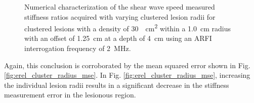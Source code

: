 			\begin{figure}[!htb]
				\centering
				\caption[Numerical characterization of shear wave speed measured stiffness ratio with clustered lesions]{Numerical characterization of the shear wave speed measured stiffness ratios acquired with varying clustered lesion radii for clustered lesions with a density of \SI{30}{\per\cm\squared} within a \SI{1.0}{cm} radius with an offset of \SI{1.25}{\cm} at a depth of \SI{4}{\cm} using an ARFI interrogation frequency of \SI{2}{\MHz}.}
				\label{fig:erel_cluster_radius}
			\end{figure}

			Again, this conclusion is corroborated by the mean squared error shown in Fig. \ref{fig:erel_cluster_radius_mse}. In Fig. \ref{fig:erel_cluster_radius_mse}, increasing the individual lesion radii results in a significant decrease in the stiffness measurement error in the lesionous region.

